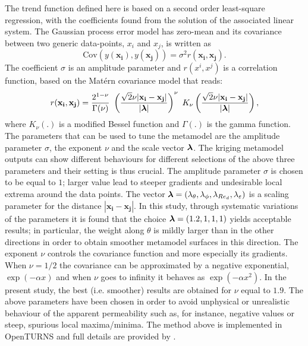 The trend function defined  here is  based on a second order least-square regression, with the coefficients found from 
the solution of the associated linear system.
The Gaussian process error model has zero-mean and its covariance between two generic data-points, $x_i$ and $x_j$, is written as 
$$
\textrm{Cov}(y(\mathbf{x_i}), y(\mathbf{x_j})) = \sigma^2 r(\mathbf{x_i}, \mathbf{x_j}).
$$
The coefficient $\sigma$ is an amplitude parameter and $r(x^i, x^j)$ is a correlation function, based on the Mat\'ern covariance model that reads:
\begin{equation}
r(\mathbf{x_i}, \mathbf{x_j}) =  \dfrac{2^{1- \nu}}{\Gamma(\nu)} \  \left( \dfrac{\sqrt{2} \nu |\mathbf{x_i} - \mathbf{x_j}|}{|\bs{\lambda}|} \right)^{\nu} \ K_{\nu}\left( \dfrac{\sqrt{2} \nu |\mathbf{x_i} - \mathbf{x_j}|}{|\bs{\lambda}|} \right),
\label{eq:matern}
\end{equation}
where $K_{\nu}(.)$ is a modified Bessel function and $\Gamma(.)$ is the gamma function.
The parameters that can be used to tune the metamodel are the amplitude parameter $\sigma$, the exponent $\nu$ and the scale vector $\boldsymbol{\lambda}$.
The kriging metamodel outputs can show different behaviours for different selections of the above three parameters and their setting is thus crucial. 
The amplitude parameter $\sigma$ is chosen to be equal to $1$; larger value lead to steeper gradients and undesirable local extrema around the data points.
The vector $\boldsymbol{\lambda}=(\lambda_{\theta}, \lambda_{\phi}, \lambda_{Re_d}, \lambda_{\varepsilon} )$ is a scaling parameter for the distance $ |\mathbf{x_i} - \mathbf{x_j}|$.
In this study, through systematic variations of the parameters it is found that  the choice $\boldsymbol{\lambda}=(1.2, 1, 1, 1)$ yields acceptable results; in particular, the weight along $\theta$ 
is mildly larger than in the other directions in order to obtain smoother metamodel surfaces in this direction.
The exponent $\nu$ controls the  covariance function and more especially its gradients. 
When  $\nu = 1/2$ the covariance can be approximated by a negative exponential, $\exp(-\alpha x)$  and  when $\nu$ goes to infinity it behaves as $\exp(-\alpha x^2)$.
In the present study, the best (i.e. smoother) results are obtained for $\nu$ equal to $1.9$.
The above parameters have been chosen in order to avoid unphysical or unrealistic  behaviour of the apparent permeability such as, for instance,  negative values or 
steep, spurious local maxima/minima.
The method above is implemented in OpenTURNS and full details are provided by \citet{openturns}. 

